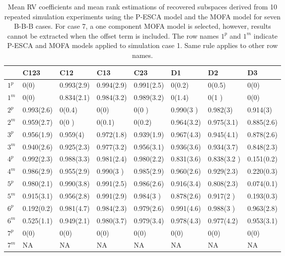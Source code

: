 \begin{table}[htbp]
\small
\centering
\caption{Mean RV coefficients and mean rank estimations of recovered subspaces derived from 10 repeated simulation experiments using the P-ESCA model and the MOFA model for seven B-B-B cases. For case 7, a one component MOFA model is selected, however, results cannot be extracted when the offset term is included. The row names $1^p$ and $1^m$ indicate P-ESCA and MOFA models applied to simulation case 1. Same rule applies to other row names.}
\label{chapter5_tab:3}
\begin{tabular}{llllllll}
  \toprule
  & C123 & C12 & C13 & C23 & D1 & D2 & D3 \\
  \midrule
 $1^{p}$  & 0(0)        & 0.993(2.9) & 0.994(2.9) & 0.991(2.5) & 0(0.2)     & 0(0.5)       & 0(0) \\
 $1^{m}$  & 0(0)        & 0.834(2.1) & 0.984(3.2) & 0.989(3.2) & 0(1.4)     & 0(1  )       & 0(0)  \\
 \hline
 $2^{p}$ & 0.993(2.6)  & 0(0.4)     & 0(0)       & 0(0  )     & 0.990(3  ) & 0.982(3)     & 0.914(3) \\
 $2^{m}$ & 0.959(2.7)  & 0(0  )     & 0(0.1)     & 0(0.2)     & 0.964(3.2) & 0.975(3.1)   & 0.885(2.6) \\
 \hline
 $3^{p}$ & 0.956(1.9)  & 0.959(4) & 0.972(1.8) & 0.939(1.9) & 0.967(4.3) & 0.945(4.1)   & 0.878(2.6) \\
 $3^{m}$ & 0.940(2.6)  & 0.925(2.3) & 0.977(3.2)   & 0.956(3.1) & 0.936(3.6) & 0.934(3.7)   & 0.848(2.3) \\
 \hline
 $4^{p}$ & 0.992(2.3)  & 0.988(3.3) & 0.981(2.4) & 0.980(2.2) & 0.831(3.6) & 0.838(3.2 )   & 0.151(0.2) \\
 $4^{m}$ & 0.986(2.9)  & 0.955(2.9) & 0.990(3  ) & 0.985(2.9) & 0.960(2.6) & 0.929(2.3)   & 0.220(0.3)      \\
 \hline
 $5^{p}$ & 0.980(2.1)  & 0.990(3.8) & 0.991(2.5)     & 0.986(2.6)   & 0.916(3.4) & 0.808(2.3)   & 0.074(0.1)\\
 $5^{m}$ & 0.915(3.1)  & 0.956(2.8) & 0.991(2.9)     & 0.984(3  )   & 0.878(2.6)   & 0.917(2  )   & 0.193(0.3)      \\
 \hline
 $6^{p}$ & 0.192(0.2)  & 0.981(4.7) & 0.984(2.3) & 0.979(2.6) & 0.991(4.6) & 0.988(3   )   & 0.963(2.8) \\
 $6^{m}$ & 0.525(1.1)  & 0.949(2.1) & 0.980(3.7) & 0.979(3.4)  & 0.978(4.3) & 0.977(4.2)   & 0.953(3.1) \\
 \hline
 $7^{p}$ & 0(0)        & 0(0)        & 0(0)        & 0(0)        & 0(0)        & 0(0)        & 0(0) \\
 $7^{m}$ & NA          & NA           & NA           & NA         & NA         &NA         & NA \\
  \bottomrule
\end{tabular}
\end{table}


